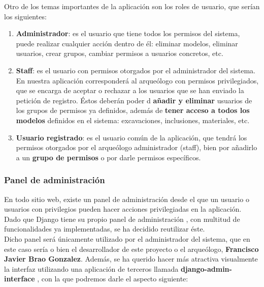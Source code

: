 Otro de los temas importantes de la aplicación son los roles de usuario, que serían los
siguientes:

    \begin{enumerate}
        \item \textbf{Administrador}: es el usuario que tiene todos los permisos del
        sistema, puede realizar cualquier acción dentro de él: eliminar modelos, eliminar
        usuarios, crear grupos, cambiar permisos a usuarios concretos, etc.
        \item \textbf{Staff}: es el usuario con permisos otorgados por el administrador
        del sistema. En nuestra aplicación corresponderá al arqueólogo con permisos
        privilegiados, que se encarga de aceptar o rechazar a los usuarios que se han
        enviado la petición de registro. Éstos deberán poder d \textbf{añadir y eliminar}
        usuarios de los grupos de permisos ya definidos, además de \textbf{tener acceso a
        todos los modelos} definidos en el sistema: excavaciones, inclusiones, materiales, etc.
        \item \textbf{Usuario registrado}: es el usuario común de la aplicación, que tendrá
        los permisos otorgados por el arqueólogo administrador (staff), bien por añadirlo
        a un \textbf{grupo de permisos} o por darle permisos específicos.
    \end{enumerate}

\subsubsection{Panel de administración}
En todo sitio web, existe un panel de administración desde el que un usuario o usuarios
con privilegios pueden hacer acciones privilegiadas en la aplicación. Dado que Django
tiene su propio panel de administración \cite{admin-panel}, con multitud de funcionalidades
ya implementadas, se ha decidido reutilizar éste.\\

Dicho panel será únicamente utilizado por el administrador del sistema, que en este caso
sería o bien el desarrollador de este proyecto o el arqueólogo, \textbf{Francisco Javier
Brao Gonzalez}. Además, se ha querido hacer más atractiva visualmente la interfaz
utilizando una aplicación de terceros llamada \textbf{django-admin-interface}
\cite{admin-interface}, con la que podremos darle el aspecto siguiente:

